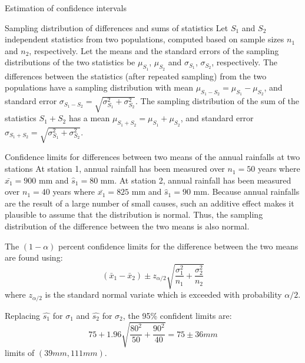 \documentclass[8pt]{beamer}
\begin{document}
\begin{frame}{Estimation of confidence intervals}
\begin{block}{Sampling distribution of differences and sums of statistics}
    Let $S_1$ and $S_2$ independent statistics from two populations, computed based on sample sizes $n_1$ and $n_2$, respectively. Let the means and the standard errors of the sampling distributions of the two statistics  be $\mu_{S_1}$, $\mu_{S_2}$ and $\sigma_{S_1}$, $\sigma_{S_2}$, respectively. The differences between the statistics (after repeated sampling) from the two populations have a sampling distribution with mean $\mu_{S_1 - S_2} = \mu_{S_1} - \mu_{S_2}$, and standard error $\sigma_{S_1 - S_2} = \sqrt{\sigma_{S_1}^2 + \sigma_{S_2}^2}$. The sampling distribution of the sum of the statistics $S_1 + S_2$ has a mean $\mu_{S_1 + S_2} = \mu_{S_1} + \mu_{S_2}$, and standard error $\sigma_{S_1 + S_2} = \sqrt{\sigma_{S_1}^2 + \sigma_{S_2}^2}$.
\end{block}
\vspace{-7pt}
    \begin{exampleblock}{Confidence limits for differences between two means of the annual rainfalls at two stations}
        At station 1, annual rainfall has been measured over $n_1 = 50$ years where $\bar{x_1} = 900$ mm and $\hat{s}_1 =80$ mm. At station 2, annual rainfall has been measured over $n_1 = 40$ years where $\bar{x_1} = 825$ mm and $\hat{s}_1 =90$ mm. Because annual rainfalls are the result of a large number of small causes, such an additive effect makes it plausible to assume that the distribution is normal. Thus, the sampling distribution of the difference between the two means is also normal. 

\begin{minipage}[t]{0.48\textwidth}
        The $(1-\alpha)$ percent confidence limits for the difference between the two means are found using:
\vspace{-14pt}
        \[
        (\bar{x}_1 - \bar{x}_2) \pm z_{\alpha/2} \sqrt{\frac{\sigma_1^2}{n_1} + \frac{\sigma_2^2}{n_2}}
    \]
    where $z_{\alpha/2}$ is the standard  normal variate  which is exceeded with probability $\alpha/2$.  
\end{minipage}
\begin{minipage}[t]{0.48\textwidth}
    Replacing $\hat{s_1}$ for $\sigma_1$ and $\hat{s_2}$ for $\sigma_2$, the 95\% confident limits are:
\vspace{-7pt}
    \[
        75 + 1.96 \sqrt{\frac{80^2}{50} + \frac{90^2}{40}} = 75 \pm 36 mm 
    \]
    limits of $(39 mm, 111 mm )$. 
\end{minipage}
    \end{exampleblock}

\end{frame}
\end{document}
